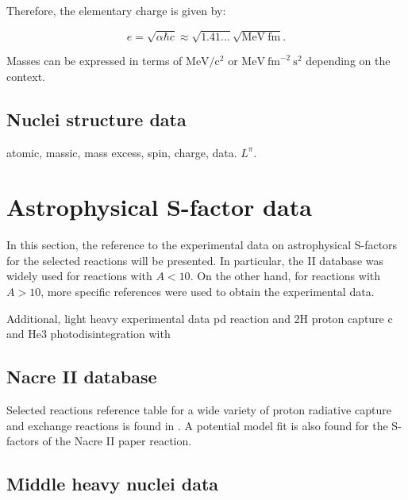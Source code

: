 \documentclass[openany]{book}
\begin{document}
Therefore, the elementary charge is given by: 

\begin{equation} \label{eq:constants_e}
	e = \sqrt{\alpha\hbar c} \approx \sqrt{1.41...} \sqrt{\mathrm{MeV \ fm}}.
\end{equation}

Masses can be expressed in terms of $\mathrm{MeV/c^2}$ or $\mathrm{MeV \ {fm}^{-2} \ s^{2}}$ depending on the context.  

\subsection{Nuclei structure data} \label{sub:nucleiStructureData}

atomic, massic, mass excess, spin, charge, data. $L^{\pi}$.

\section{Astrophysical S-factor data} \label{sec:sfactorData}

In this section, the reference to the experimental data on astrophysical S-factors for the selected reactions will be presented. In particular, the  II database was widely used for reactions with $A < 10$. On the other hand, for reactions with $A > 10$, more specific references were used to obtain the experimental data.

Additional, light heavy experimental data pd reaction \cite{bystritsky_gerasimov_krylov_parzhitskii_dudkin_kaminskii_nechaev_padalko_petrov_mesyats_et_2008} and 2H proton capture c\cite{schmid_chasteler_laymon_weller_prior_tilley_1995} and He3 photodisintegration \cite{berman_koester_smith_1964} with \cite{warren_erdman_robertson_axen_macdonald_1963}

\subsection{Nacre II database} \label{sub:nacreII}

Selected reactions reference table for a wide variety of proton radiative capture and exchange reactions is found in \cite{xu_takahashi_goriely_arnould_ohta_utsunomiya_2013}. A potential model fit is also found for the S-factors of the Nacre II paper reaction.


\subsection{Middle heavy nuclei data} \label{sub:middleHeavyData}
\end{document}
